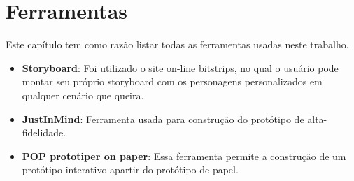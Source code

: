 \chapter[Ferramentas]{Ferramentas}

Este capítulo tem como razão listar todas as ferramentas usadas neste trabalho.

\begin{itemize}
	\item \textbf{Storyboard}: Foi utilizado o site on-line bitstrips\nocite{website:bitstrips}, no qual o usuário pode montar seu próprio storyboard com os personagens personalizados em qualquer cenário que queira.
	\item \textbf{JustInMind}: Ferramenta usada para construção do protótipo de alta-fidelidade.
	\item \textbf{POP prototiper on paper}: Essa ferramenta permite a construção de um protótipo interativo apartir do protótipo de papel.
\end{itemize}


